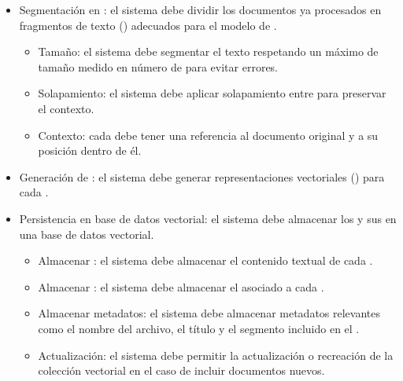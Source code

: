 \begin{itemize}
\begin{itemize}
		\item {} Limpieza y normalización del texto: el sistema debe limpiar y normalizar el texto que se extrae de los documentos.
		\begin{itemize}
		\tightlist
			\item {} Eliminar caracteres: el sistema debe eliminar los caracteres irrelevantes o problemáticos.
			\item {} Normalización: el sistema debe normalizar los espacios, saltos de línea y formatos inconsistentes.
		\end{itemize}
	\end{itemize}
	\item {} Segmentación en : el sistema debe dividir los documentos ya procesados en fragmentos de texto () adecuados para el modelo de .
	\begin{itemize}
	\tightlist
		\item {} Tamaño: el sistema debe segmentar el texto respetando un máximo de tamaño medido en número de  para evitar errores.
		\item {} Solapamiento: el sistema debe aplicar solapamiento entre  para preservar el contexto.
		\item {} Contexto: cada  debe tener una referencia al documento original y a su posición dentro de él.
	\end{itemize}
	\item {} Generación de : el sistema debe generar representaciones vectoriales () para cada .
	\item {} Persistencia en base de datos vectorial: el sistema debe almacenar los  y sus  en una base de datos vectorial.
	\begin{itemize}
	\tightlist
		\item {} Almacenar : el sistema debe almacenar el contenido textual de cada .
		\item {} Almacenar : el sistema debe almacenar el  asociado a cada .
		\item {} Almacenar metadatos: el sistema debe almacenar metadatos relevantes como el nombre del archivo, el título y el segmento incluido en el .
		\item {} Actualización: el sistema debe permitir la actualización o recreación de la colección vectorial en el caso de incluir documentos nuevos.

\end{itemize}
\end{itemize}
